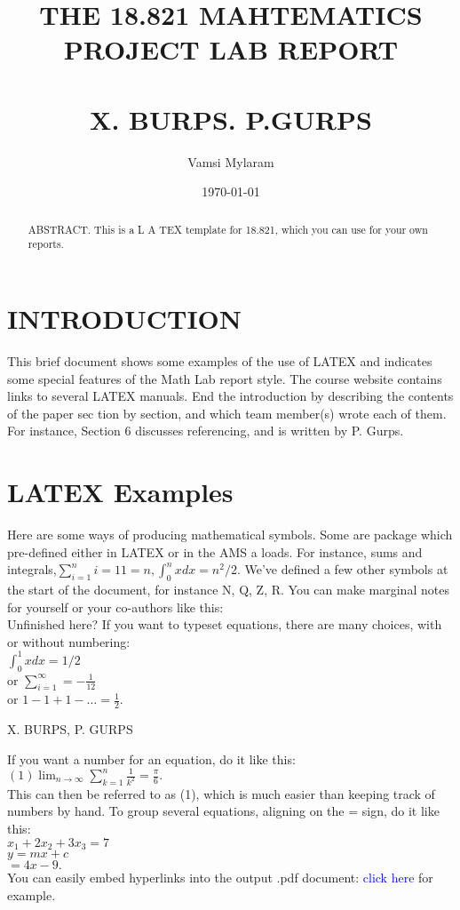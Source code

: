 \documentclass{article}
\title{THE 18.821 MAHTEMATICS PROJECT LAB REPORT \\[REPLACE THIS WITH YOUR OWN SHORT DESCRIPTIVE TITLE!]\\
	\vspace{1cm}X. BURPS. P.GURPS}
\date{\today}
\author{Vamsi Mylaram}
\begin{document}
\maketitle

 	 \begin{abstract}
 	  ABSTRACT. This is a L A TEX template for 18.821, which you can
 	  use for your own reports.
 	 \end{abstract}
  \centering \section{INTRODUCTION}
  This brief document shows some examples of the use of LATEX and
  indicates some special features of the Math Lab report style. The
  course website contains links to several LATEX manuals.
  End the introduction by describing the contents of the paper sec­
  tion by section, and which team member(s) wrote each of them. For
  instance, Section 6 discusses referencing, and is written by P. Gurps.
	
	\section{LATEX Examples}

	Here are some ways of producing mathematical symbols. Some are
	package which
	pre-deﬁned either in LATEX or in the AMS a
	loads. For instance, sums and integrals,$\sum_{i=1}^{n} i=1 1 = n, \int^n_0 x dx= n^2/2.$
	We’ve deﬁned a few other symbols at the start of the document, for
	instance N, Q, Z, R. You can make marginal notes for yourself or your
	co-authors like this:\\
	Unﬁnished here?
	If you want to typeset equations, there are many choices, with or
	without numbering:\\
	 $\int^1_0 xdx=1/2$  \vspace{1mm}
	 \\
	or \hspace{5mm}    $\sum_{i=1}^{\infty}=-\frac{1}{12}$
	\\
	or \hspace{1cm}
		$1-1+1-\ldots=\frac{1}{2}$.
		\\ \vspace{1cm}
	\caption{X. BURPS, P. GURPS}
		
	
	If you want a number for an equation, do it like this:\\
	$(1) \lim_{n\to\infty} \sum_{k=1}^{n}\frac{1}{k^2}=\frac{\pi}{6}.$
	\\
	This can then be referred to as (1), which is much easier than keeping
	track of numbers by hand. To group several equations, aligning on the
	= sign, do it like this:
	\\
	 $x_1+2x_2+3x_3=7$ \\
	 $y=mx+c$ \\
	 $=4x-9.$ \\
	 You can easily embed hyperlinks into the output .pdf document:
	 {\textcolor{blue}{click here}} for example. \\
	 
\end{document}

